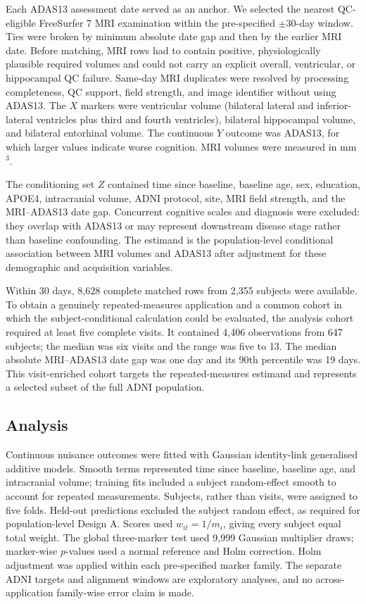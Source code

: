\documentclass[11pt]{article}
\theoremstyle{definition}
\begin{document}
Each ADAS13 assessment date served as an anchor. We selected the nearest QC-eligible
FreeSurfer 7 MRI examination within the pre-specified $\pm30$-day window. Ties were broken
by minimum absolute date
gap and then by the earlier MRI date. Before matching, MRI rows had to contain positive,
physiologically plausible required volumes and could not carry an explicit overall,
ventricular, or hippocampal QC failure. Same-day MRI duplicates were resolved by processing
completeness, QC support, field strength, and image identifier without using ADAS13. The
$X$ markers were ventricular volume (bilateral lateral and inferior-lateral ventricles plus
third and fourth ventricles), bilateral hippocampal volume, and bilateral entorhinal volume.
The continuous $Y$ outcome was ADAS13, for which larger values indicate worse cognition.
MRI volumes were measured in mm$^3$.

The conditioning set $Z$ contained time since baseline, baseline age, sex, education, APOE4,
intracranial volume, ADNI protocol, site, MRI field strength, and the MRI--ADAS13 date gap.
Concurrent cognitive scales and diagnosis were excluded: they overlap with ADAS13 or may
represent downstream disease stage rather than baseline confounding. The estimand is the
population-level conditional association between MRI volumes and ADAS13 after adjustment for
these demographic and acquisition variables.

Within 30 days, 8,628 complete matched rows from 2,355 subjects were available. To obtain a
genuinely repeated-measures application and a common cohort in which the
subject-conditional calculation could be evaluated, the analysis cohort required at least
five complete visits. It contained 4,406 observations from 647 subjects; the median was six
visits and the range was five to 13. The median absolute MRI--ADAS13 date gap was one day and
its 90th percentile was 19 days. This visit-enriched cohort targets the repeated-measures
estimand and represents a selected subset of the full ADNI population.

\subsection{Analysis}

Continuous nuisance outcomes were fitted with Gaussian identity-link generalised additive
models. Smooth terms represented time since baseline, baseline age, and intracranial volume;
training fits included a subject random-effect smooth to account for repeated measurements.
Subjects, rather than visits, were assigned to five folds. Held-out predictions excluded the
subject random effect, as required for population-level Design A. Scores used
$w_{it}=1/m_i$, giving every subject equal total weight. The global three-marker test used
9,999 Gaussian multiplier draws; marker-wise $p$-values used a normal reference and Holm
correction. Holm adjustment was applied within each pre-specified marker family. The separate
ADNI targets and alignment windows are exploratory analyses, and no across-application
family-wise error claim is made.
\end{document}
